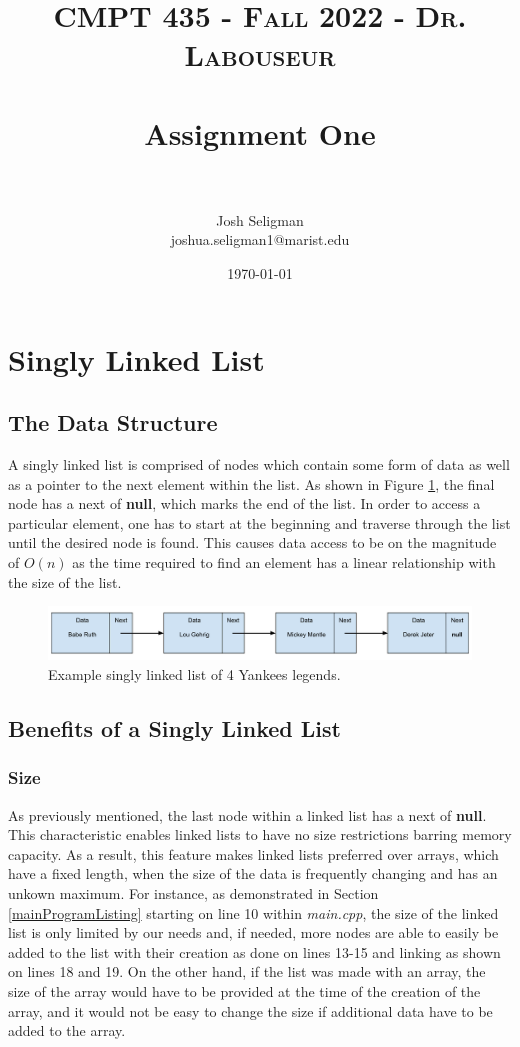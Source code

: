 \documentclass[letterpaper, 10pt,DIV=13]{scrartcl}
\title{	
   \normalfont \normalsize 
   \textsc{CMPT 435 - Fall 2022 - Dr. Labouseur} \\[10pt] %
   \horrule{0.5pt} \\[0.25cm] 	%
   \huge Assignment One  \\     	    %
   \horrule{0.5pt} \\[0.25cm] 	%
}
\author{Josh Seligman \\ \normalsize joshua.seligman1@marist.edu}
\date{\normalsize\today} 	%
\numberwithin{equation}{section} %
\numberwithin{figure}{section} %
\numberwithin{table}{section} %
\begin{document}
\maketitle %

\section{Singly Linked List}
\subsection{The Data Structure}
A singly linked list is comprised of nodes which contain some form of data as well as a pointer to the next element within the list. As shown in 
Figure \ref{figure:linkedList}, the final node has a next of \textbf{null}, which marks the end of the list. In order to access a particular element,
one has to start at the beginning and traverse through the list until the desired node is found. This causes data access to be on the magnitude of $O(n)$ as the time required
to find an element has a linear relationship with the size of the list.

\begin{figure}[ht] 
    \centering 
    \includegraphics[width=15cm]{linkedList}
    \caption{Example singly linked list of 4 Yankees legends.}
    \label{figure:linkedList}
 \end{figure}

\subsection{Benefits of a Singly Linked List}
\subsubsection{Size}
As previously mentioned, the last node within a linked list has a next of \textbf{null}. This characteristic enables linked lists to have no size restrictions barring memory capacity.
As a result, this feature makes linked lists preferred over arrays, which have a fixed length, when the size of the data is frequently changing and has an unkown maximum. For instance, as demonstrated in
Section \ref{mainProgramListing} starting on line 10 within \textit{main.cpp}, the size of the linked list is only limited by our needs and, if needed, more nodes are able
to easily be added to the list with their creation as done on lines 13-15 and linking as shown on lines 18 and 19. On the other hand, if the list was made with an array,
the size of the array would have to be provided at the time of the creation of the array, and it would not be easy to change the size if additional data have to be added
to the array.
\end{document}

